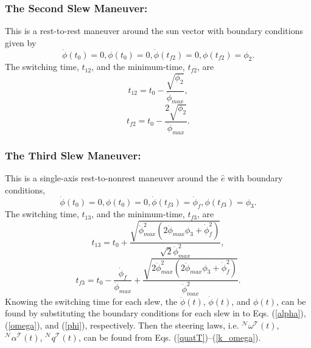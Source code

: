\documentclass[letterpaper, paper,12pt]{AAS}		%
\begin{document}
	\subsubsection{The Second Slew Maneuver:}
	This is a rest-to-rest maneuver around the sun vector with boundary conditions given by	
	\begin{equation}\label{Bc2}
	\dot{\phi}(t_0)=0, \phi(t_0)=0, \dot{\phi}(t_{f2})=0, \phi(t_{f2})=\phi_2.
	\end{equation}
	The switching time, $t_{12}$, and the minimum-time, $t_{f2}$, are
	\begin{equation}\label{t21}
	t_{12}=t_0-\frac{\sqrt{\phi_2}}{\ddot{\phi}_{max}},
	\end{equation}
	\begin{equation}\label{tf2}
	t_{f2}=t_0-\frac{2\sqrt{\phi_2}}{\ddot{\phi}_{max}}.
	\end{equation}

	
	
	\subsubsection{The Third Slew Maneuver:}
	 This is a  single-axis rest-to-nonrest maneuver around the $\hat{e}$ with boundary conditions,
	\begin{equation}\label{Bc3}
	\dot{\phi}(t_0)=0,\phi(t_0)=0, \dot{\phi}(t_{f3})=\dot{\phi}_{f},\phi(t_{f3})=\phi_3.
	\end{equation}
	The switching time, $t_{13}$, and the minimum-time, $t_{f3}$, are
	\begin{equation}\label{t31}
	t_{13}=t_0+\frac{\sqrt{\ddot{\phi}_{max}^2(2\ddot{\phi}_{max}\phi_3+\dot{\phi}_{f}^2)}}{\sqrt{2}\ddot{\phi}_{max}^2},
	\end{equation}
	\begin{equation}\label{tf3}
	t_{f3}=t_0-\frac{\dot{\phi}_{f}}{\ddot{\phi}_{max}}+\frac{\sqrt{2\ddot{\phi}_{max}^2(2\ddot{\phi}_{max}\phi_3+\dot{\phi}_{f}^2)}}{\ddot{\phi}_{max}^2}.
	\end{equation}
	Knowing the switching time for each slew, the $\ddot{\phi}(t)$, $\dot{\phi}(t)$, and  $\phi(t)$, can be found by substituting the boundary conditions for each slew in to Eqs. (\ref{alpha}), (\ref{omega}), and (\ref{phi}), respectively. Then the steering laws, i.e. $^\mathcal{N}\omega^\mathcal{T}(t)$, $^\mathcal{N}\alpha^\mathcal{T}(t)$, $^\mathcal{N}q^\mathcal{T}(t)$, can be found from Eqs. (\ref{quatT})--(\ref{k_omega}).	
\end{document}

